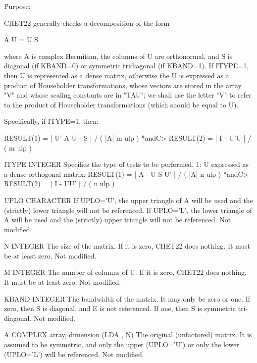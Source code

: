 \begin{DoxyParagraph}{Purpose\+: }
\begin{DoxyVerb}      CHET22  generally checks a decomposition of the form

              A U = U S

      where A is complex Hermitian, the columns of U are orthonormal,
      and S is diagonal (if KBAND=0) or symmetric tridiagonal (if
      KBAND=1).  If ITYPE=1, then U is represented as a dense matrix,
      otherwise the U is expressed as a product of Householder
      transformations, whose vectors are stored in the array "V" and
      whose scaling constants are in "TAU"; we shall use the letter
      "V" to refer to the product of Householder transformations
      (which should be equal to U).

      Specifically, if ITYPE=1, then:

              RESULT(1) = | U' A U - S | / ( |A| m ulp ) *andC>              RESULT(2) = | I - U'U | / ( m ulp )\end{DoxyVerb}
 \begin{DoxyVerb}  ITYPE   INTEGER
          Specifies the type of tests to be performed.
          1: U expressed as a dense orthogonal matrix:
             RESULT(1) = | A - U S U' | / ( |A| n ulp )   *andC>             RESULT(2) = | I - UU' | / ( n ulp )

  UPLO    CHARACTER
          If UPLO='U', the upper triangle of A will be used and the
          (strictly) lower triangle will not be referenced.  If
          UPLO='L', the lower triangle of A will be used and the
          (strictly) upper triangle will not be referenced.
          Not modified.

  N       INTEGER
          The size of the matrix.  If it is zero, CHET22 does nothing.
          It must be at least zero.
          Not modified.

  M       INTEGER
          The number of columns of U.  If it is zero, CHET22 does
          nothing.  It must be at least zero.
          Not modified.

  KBAND   INTEGER
          The bandwidth of the matrix.  It may only be zero or one.
          If zero, then S is diagonal, and E is not referenced.  If
          one, then S is symmetric tri-diagonal.
          Not modified.

  A       COMPLEX array, dimension (LDA , N)
          The original (unfactored) matrix.  It is assumed to be
          symmetric, and only the upper (UPLO='U') or only the lower
          (UPLO='L') will be referenced.
          Not modified.


\end{DoxyVerb}
\end{DoxyParagraph}
